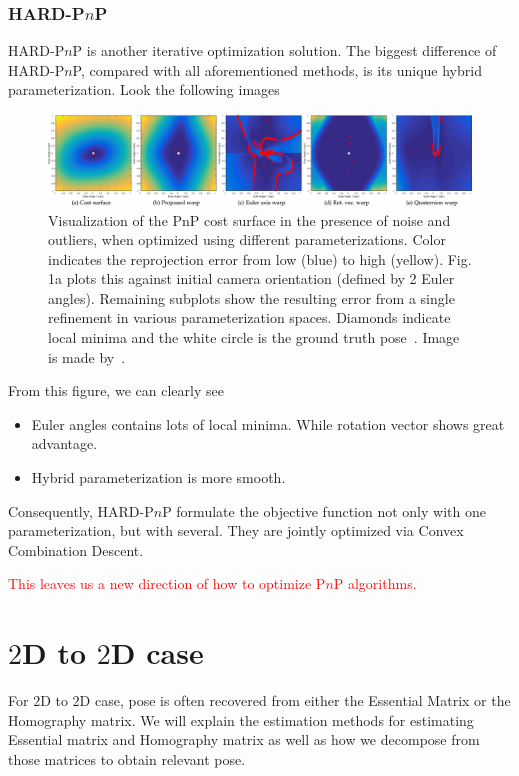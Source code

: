 \documentclass[a4paper]{report}
\begin{document}
\subsection{HARD-P$n$P}
HARD-P$n$P is another iterative optimization solution. The biggest difference of HARD-P$n$P, compared with all aforementioned methods, is its unique hybrid parameterization. Look the following images

\begin{figure}
\centering
\includegraphics[scale=0.14]{hand_eye_files/vision/figures/hadfi1-2806446-hires.png}
\caption{Visualization of the PnP cost surface in the presence of noise and outliers, when optimized using different parameterizations. Color indicates the reprojection error from low (blue) to high (yellow). Fig. 1a plots this against initial camera orientation (defined by 2 Euler angles). Remaining subplots show the resulting error from a single refinement in various parameterization spaces. Diamonds indicate local minima and the white circle is the ground truth pose~\cite{8292943}. Image is made by~\cite{8292943}.}
\end{figure}
From this figure, we can clearly see
\begin{itemize}
\item Euler angles contains lots of local minima. While rotation vector shows great advantage.
\item Hybrid parameterization is more smooth.
\end{itemize}
Consequently, HARD-P$n$P formulate the objective function not only with one parameterization, but with several. They are jointly optimized via Convex Combination Descent. 

\textcolor{red}{This leaves us a new direction of how to optimize P$n$P algorithms.}

\chapter{$2$D to $2$D case}
For $2$D to $2$D case, pose is often recovered from either the Essential Matrix or the Homography matrix. We will explain the estimation methods for estimating Essential matrix and Homography matrix as well as how we decompose from those matrices to obtain relevant pose.
\end{document}

